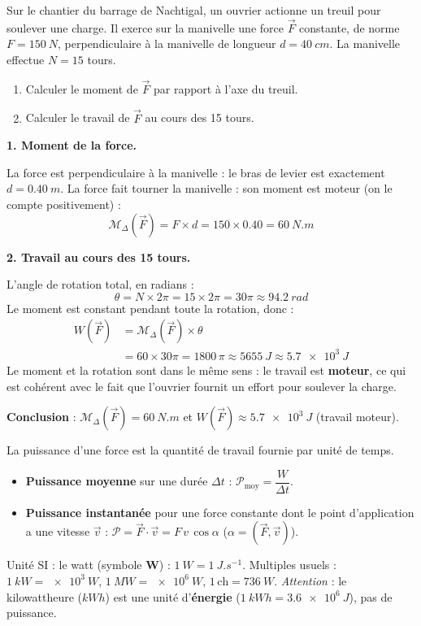 \documentclass[11pt]{article}
\newcommand{\cle}[1]{{\popxbold\color{popdark}#1}}
\newcounter{popsec}
\newcounter{popsub}
\newcommand{\courssub}[1]{%
  \stepcounter{popsub}%
  \par\vspace{9pt}\noindent{\popxbold\fontsize{11.5}{13}\selectfont\color{popink}{\color{poporange}\thepopsec.\thepopsub}\hspace{6pt}#1}\par\nopagebreak\vspace{4pt}
}
\begin{document}
\begin{exoresolu}
Sur le chantier du barrage de Nachtigal, un ouvrier actionne un treuil pour soulever une charge. Il exerce sur la manivelle une force $\vec{F}$ constante, de norme $F = \SI{150}{N}$, perpendiculaire à la manivelle de longueur $d = \SI{40}{cm}$. La manivelle effectue $N = 15$ tours.
\begin{enumerate}
\item Calculer le moment de $\vec{F}$ par rapport à l'axe du treuil.
\item Calculer le travail de $\vec{F}$ au cours des 15 tours.
\end{enumerate}
\tcblower
\textbf{1. Moment de la force.}

La force est perpendiculaire à la manivelle : le bras de levier est exactement $d = \SI{0.40}{m}$. La force fait tourner la manivelle : son moment est moteur (on le compte positivement) :
\[ \mathcal{M}_{\Delta}(\vec{F}) = F \times d = 150 \times 0.40 = \SI{60}{N.m} \]

\textbf{2. Travail au cours des 15 tours.}

L'angle de rotation total, en radians :
\[ \theta = N \times 2\pi = 15 \times 2\pi = 30\pi \approx \SI{94.2}{rad} \]
Le moment est constant pendant toute la rotation, donc :
\begin{align*}
W(\vec{F}) &= \mathcal{M}_{\Delta}(\vec{F}) \times \theta \\
&= 60 \times 30\pi = 1800\,\pi \approx \SI{5655}{J} \approx \SI{5.7e3}{J}
\end{align*}
Le moment et la rotation sont dans le même sens : le travail est \textbf{moteur}, ce qui est cohérent avec le fait que l'ouvrier fournit un effort pour soulever la charge.

\textbf{Conclusion} : $\mathcal{M}_{\Delta}(\vec{F}) = \SI{60}{N.m}$ et $W(\vec{F}) \approx \SI{5.7e3}{J}$ (travail moteur).
\end{exoresolu}

\courssub{Puissance d'une force}

\begin{definition}
La \cle{puissance} d'une force est la quantité de travail fournie par unité de temps.
\begin{itemize}
\item \textbf{Puissance moyenne} sur une durée $\Delta t$ : $\mathcal{P}_{\text{moy}} = \dfrac{W}{\Delta t}$.
\item \textbf{Puissance instantanée} pour une force constante dont le point d'application a une vitesse $\vec{v}$ : $\mathcal{P} = \vec{F}\cdot\vec{v} = F\,v\,\cos\alpha$ ($\alpha = (\vec{F}, \vec{v})$).
\end{itemize}
Unité SI : le \cle{watt} (symbole \textbf{W}) : $\SI{1}{W} = \SI{1}{J.s^{-1}}$.
Multiples usuels : $\SI{1}{kW} = \SI{e3}{W}$, $\SI{1}{MW} = \SI{e6}{W}$, $1\,\text{ch} = \SI{736}{W}$.
\emph{Attention} : le kilowattheure ($\si{kWh}$) est une unité d'\textbf{énergie} ($\SI{1}{kWh} = \SI{3.6e6}{J}$), pas de puissance.
\end{definition}
\end{document}
